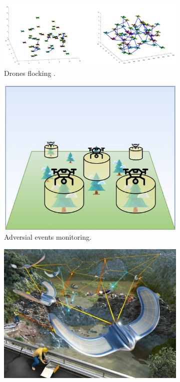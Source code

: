 \documentclass[12pt,a4paper,openright,twoside]{book}
\begin{document}
\begin{figure}[t]
    \begin{subfigure}[b]{0.49\textwidth}
        \centering
        \includegraphics[width=\textwidth]{figures/cpsw-1.pdf}
        \caption{Drones flocking \cite{drones2040033}.}
        \label{fig:cpsw1}
    \end{subfigure}
    \begin{subfigure}[b]{0.45\textwidth}
        \centering
        \includegraphics[width=\textwidth]{figures/cpsw-2.png}
        \caption{Adversial events monitoring.}
        \label{fig:cpsw2}
    \end{subfigure}
    \begin{subfigure}[b]{0.49\textwidth}
        \centering
        \includegraphics[width=\textwidth]{figures/cpsw2-1.pdf}

\end{subfigure}
\end{figure}
\end{document}
